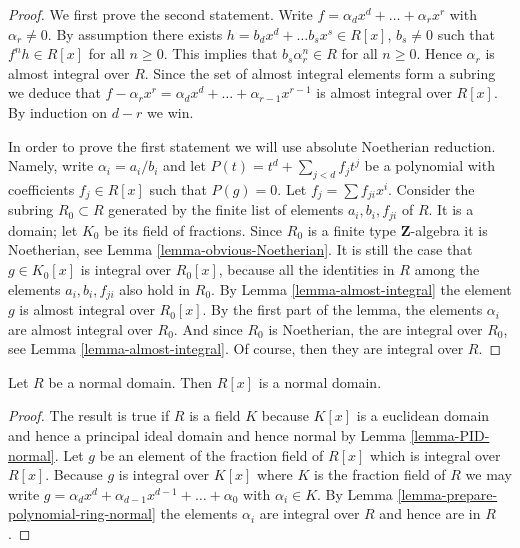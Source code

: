 \begin{proof}
We first prove the second statement.
Write $f = \alpha_d x^d + \ldots + \alpha_r x^r$
with $\alpha_r \not = 0$.
By assumption there exists $h = b_d x^d + \ldots b_s x^s \in R[x]$,
$b_s \not= 0$ such that $f^n h \in R[x]$ for all
$n \geq 0$. This implies that $b_s \alpha_r^n \in R$
for all $n \geq 0$. Hence $\alpha_r$ is almost
integral over $R$. Since the set of almost integral
elements form a subring we deduce that
$f - \alpha_r x^r = \alpha_d x^d + \ldots + \alpha_{r-1} x^{r-1}$
is almost integral over $R[x]$. By induction on $d-r$ we win.

\medskip\noindent
In order to prove the first statement we will use absolute Noetherian
reduction. Namely, write $\alpha_i = a_i / b_i$ and
let $P(t) = t^d + \sum_{j < d} f_j t^j$ be a polynomial
with coefficients $f_j \in R[x]$ such that $P(g) = 0$.
Let $f_j = \sum f_{ji}x^i$. Consider the subring
$R_0 \subset R$ generated by the finite list of elements
$a_i, b_i, f_{ji}$ of $R$. It is a domain; let
$K_0$ be its field of fractions. Since $R_0$ is a finite type
$\mathbf{Z}$-algebra it is Noetherian, see
Lemma \ref{lemma-obvious-Noetherian}. It is still
the case that $g \in K_0[x]$ is integral over $R_0[x]$,
because all the identities in $R$
among the elements $a_i, b_i, f_{ji}$ also hold in $R_0$.
By Lemma \ref{lemma-almost-integral} the element
$g$ is almost integral over $R_0[x]$. By the first part of
the lemma, the elements $\alpha_i$ are almost integral
over $R_0$. And since $R_0$ is Noetherian, the are
integral over $R_0$, see Lemma \ref{lemma-almost-integral}.
Of course, then they are integral over $R$.
\end{proof}

\begin{lemma}
\label{lemma-polynomial-domain-normal}
Let $R$ be a normal domain.
Then $R[x]$ is a normal domain.
\end{lemma}

\begin{proof}
The result is true if $R$ is a field $K$ because
$K[x]$ is a euclidean domain and hence a principal ideal
domain and hence normal by Lemma \ref{lemma-PID-normal}.
Let $g$ be an element of the fraction field of
$R[x]$ which is integral over $R[x]$. Because $g$
is integral over $K[x]$ where $K$ is the fraction
field of $R$ we may write $g = \alpha_d x^d + \alpha_{d-1}x^{d-1} +
\ldots + \alpha_0$ with $\alpha_i \in K$.
By Lemma \ref{lemma-prepare-polynomial-ring-normal}
the elements $\alpha_i$ are integral over $R$ and
hence are in $R$.
\end{proof}

